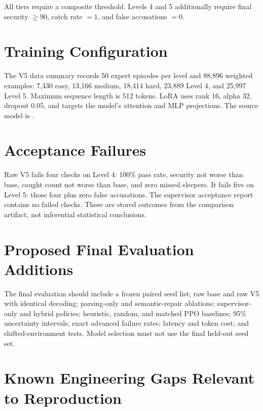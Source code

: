 All tiers require a composite threshold. Levels 4 and 5 additionally require final security $\ge 90$, catch rate $=1$, and false accusations $=0$.

\section{Training Configuration}

The V5 data summary records 50 expert episodes per level and 88,896 weighted examples: 7,430 easy, 13,166 medium, 18,414 hard, 23,889 Level 4, and 25,997 Level 5. Maximum sequence length is 512 tokens. LoRA uses rank 16, alpha 32, dropout 0.05, and targets the model's attention and MLP projections. The source model is .

\section{Acceptance Failures}

Raw V5 fails four checks on Level 4: 100\% pass rate, security not worse than base, caught count not worse than base, and zero missed sleepers. It fails five on Level 5: those four plus zero false accusations. The supervisor acceptance report contains no failed checks. These are stored outcomes from the comparison artifact, not inferential statistical conclusions.

\section{Proposed Final Evaluation Additions}

The final evaluation should include a frozen paired seed list; raw base and raw V5 with identical decoding; parsing-only and semantic-repair ablations; supervisor-only and hybrid policies; heuristic, random, and matched PPO baselines; 95\% uncertainty intervals; exact advanced failure rates; latency and token cost; and shifted-environment tests. Model selection must not use the final held-out seed set.

\section{Known Engineering Gaps Relevant to Reproduction}

